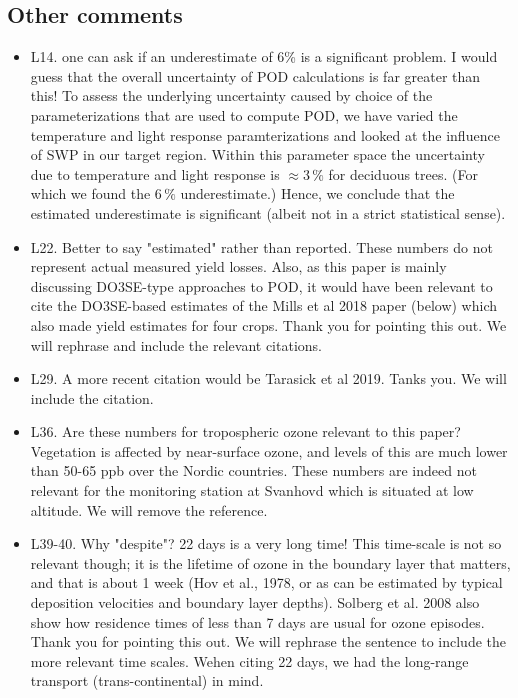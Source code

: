 \documentclass{scrartcl}
\begin{document}
\subsection*{Other comments} 
\begin{itemize}

\item {\color{blue}L14. one can ask if an underestimate of 6\% is a significant problem. I would guess that the overall uncertainty of POD calculations is far greater than this!} To assess the underlying uncertainty caused by choice of the parameterizations that are used to compute POD, we have varied the temperature and light response paramterizations and looked at the influence of SWP in our target region. Within this parameter space the uncertainty due to temperature and light response is $\approx3\,\%$ for deciduous trees. (For which we found the $6\,\%$ underestimate.) Hence, we conclude that the estimated underestimate is significant (albeit not in a strict statistical sense).

\item {\color{blue}L22. Better to say "estimated" rather than reported. These numbers do not represent actual measured yield losses. Also, as this paper is mainly discussing DO3SE-type approaches to POD, it would have been relevant to cite the DO3SE-based estimates of the Mills et al 2018 paper (below) which also made yield estimates for four crops.} Thank you for pointing this out. We will rephrase and include the relevant citations.

\item {\color{blue}L29. A more recent citation would be Tarasick et al 2019.}
Tanks you. We will include the citation.

\item {\color{blue}L36. Are these numbers for tropospheric ozone relevant to this paper? Vegetation is affected by near-surface ozone, and levels of this are much lower than 50-65 ppb over the Nordic countries.}
These numbers are indeed not relevant for the monitoring station at Svanhovd which is situated at low altitude. We will remove the reference.

\item {\color{blue}L39-40. Why "despite"? 22 days is a very long time! This time-scale is not so relevant though; it is the lifetime of ozone in the boundary layer that matters, and that is about 1 week (Hov et al., 1978, or as can be estimated by typical deposition velocities and boundary layer depths). Solberg et al. 2008 also show how residence times of less than 7 days are usual for ozone episodes.} Thank you for pointing this out. We will rephrase the sentence to include the more relevant time scales. Wehen citing 22 days, we had the long-range transport (trans-continental) in mind.


\end{itemize}
\end{document}
